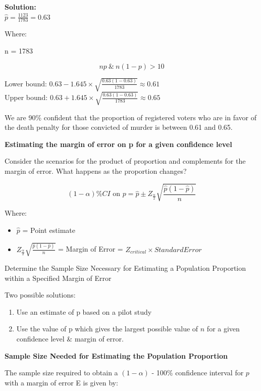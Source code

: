 \documentclass[
]{book}
\providecommand{\tightlist}{%
  \setlength{\itemsep}{0pt}\setlength{\parskip}{0pt}}
\begin{document}
\textbf{Solution:}\\
\(\hat{p} = \frac{1123}{1783} = 0.63\)

Where:

n = 1783

\[
np \ \& \ n(1-p) > 10
\]

Lower bound: \(0.63 - 1.645 \times \sqrt{\frac{0.63(1-0.63)}{1783}} \approx 0.61\)\\
Upper bound: \(0.63 + 1.645 \times \sqrt{\frac{0.63(1-0.63)}{1783}} \approx 0.65\)

We are 90\% confident that the proportion of registered voters who are in favor of the death penalty for those convicted of murder is between 0.61 and 0.65.

\textbf{Estimating the margin of error on p for a given confidence level}

Consider the scenarios for the product of proportion and complements for the margin of error. What happens as the proportion changes?

\[
(1 - \alpha)\% CI \text{ on } p = \hat{p} \pm Z_{\frac{\alpha}{2}} \sqrt{\frac{\hat{p}(1-\hat{p})}{n}}
\]

Where:

\begin{itemize}
\tightlist
\item
  \(\hat{p}\) = Point estimate
\item
  \(Z_{\frac{\alpha}{2}} \sqrt{\frac{\hat{p}(1-\hat{p})}{n}}\) = Margin of Error = \(Z_{critical} \times Standard Error\)
\end{itemize}

Determine the Sample Size Necessary for Estimating a Population Proportion within a Specified Margin of Error

Two possible solutions:

\begin{enumerate}
\def\labelenumi{\arabic{enumi}.}
\tightlist
\item
  Use an estimate of p based on a pilot study
\item
  Use the value of p which gives the largest possible value of \(n\) for a given confidence level \(\&\) margin of error.
\end{enumerate}

\textbf{Sample Size Needed for Estimating the Population Proportion}

The sample size required to obtain a \((1 - \alpha)\) - 100\% confidence interval for \(p\) with a margin of error E is given by:
\end{document}
